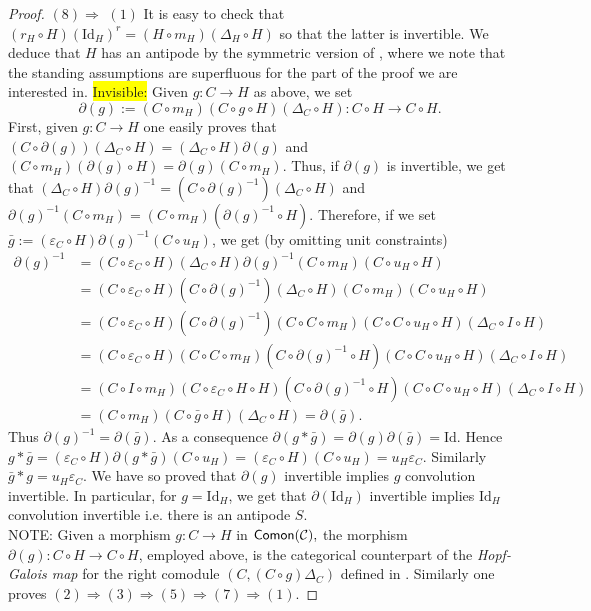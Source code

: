 \documentclass[nosumlimits,twoside]{amsart}
\theoremstyle{definition}
\theoremstyle{remark}
\newenvironment{invisible}{{\noindent\sc \colorbox{yellow}{Invisible:}\;}\color{gray}}{\medskip}
\newcommand{\id}{\mathrm{Id}}
\newcommand{\Cc}{\mathcal{C}}
\def\Comon{{\sf Comon}}
\begin{document}
\begin{proof}
    $(8)\Rightarrow$ $(1)$ It is easy to check that $(r_H\circ H)(\id_H)^r=(H\circ m_H)(\Delta_H\circ H)$ so that the latter is invertible. We deduce that $H$ has an antipode by the symmetric version of \cite[Theorem 1.8]{Ve}, where we note that the standing assumptions are superfluous for the part of the proof we are interested in.
\begin{invisible}
Given $g:C\rightarrow H$ as above, we  set
\begin{equation*}
\partial \left( g\right):=\left( C\circ m_{H}\right) \left( C\circ g\circ
H\right) \left( \Delta _{C}\circ H\right):C\circ H\to  C\circ H.
\end{equation*}
First, given $g:C\to H$ one easily proves that $(C\circ \partial(g))(\Delta_C\circ H)=(\Delta_C\circ H)\partial(g)$ and $(C\circ m_H)(\partial(g)\circ H)=\partial(g)(C\circ m_H)$. Thus, if $\partial(g)$ is invertible, we get that  $(\Delta_C\circ H)\partial(g)^{-1}=(C\circ \partial(g)^{-1})(\Delta_C\circ H)$ and $\partial(g)^{-1}(C\circ m_H)=(C\circ m_H)(\partial(g)^{-1}\circ H)$. Therefore, if we set $\bar g:=(\varepsilon_C\circ H)\partial(g)^{-1}(C\circ u_H)$, we get (by omitting unit constraints)
\begin{align*}
\partial(g)^{-1}&=(C\circ  \varepsilon_C\circ H)(\Delta_C\circ H)\partial(g)^{-1}(C\circ m_H)(C\circ  u_H\circ H)
\\ &=(C\circ  \varepsilon_C\circ H)(C\circ \partial(g)^{-1})(\Delta_C\circ H)(C\circ m_H)(C\circ  u_H\circ H)
\\ &=(C\circ  \varepsilon_C\circ H)(C\circ \partial(g)^{-1})(C\circ C\circ m_H)(C\circ C\circ   u_H\circ H)(\Delta_C\circ I\circ H)
\\ &=(C\circ  \varepsilon_C\circ H)(C\circ C\circ m_H)(C\circ \partial(g)^{-1}\circ H)(C\circ C\circ   u_H\circ H)(\Delta_C\circ I\circ H)
\\ &=(C\circ I\circ m_H)(C\circ  \varepsilon_C\circ H\circ H)(C\circ \partial(g)^{-1}\circ H)(C\circ C\circ   u_H\circ H)(\Delta_C\circ I\circ H)
\\ &=(C\circ m_H)(C\circ  \bar g\circ H)(\Delta_C\circ H)=\partial(\bar g).
\end{align*}
Thus $\partial(g)^{-1}=\partial(\bar g)$. As a consequence $\partial(g*\bar g)=\partial(g)\partial(\bar g)=\id$. Hence
$g*\bar g=(\varepsilon_C\circ H)\partial(g*\bar g)(C\circ  u_H)=(\varepsilon_C\circ H)(C\circ  u_H)=u_H\varepsilon_C$. Similarly $\bar g*g=u_H\varepsilon_C$. We have so proved that $\partial(g)$ invertible implies $g$ convolution invertible.
In particular, for $g=\id_H$, we get that $\partial(\id_H)$ invertible implies $\id_H$ convolution invertible i.e. there is an antipode $S$. \\
NOTE: Given a morphism $g:C\rightarrow H$ in $\Comon(\Cc),$ the morphism $\partial \left( g\right):C\circ H\to  C\circ H$, employed above,
    is the categorical counterpart of the \emph{Hopf-Galois map} for the right comodule $(C,(C\circ g)\Delta_C)$ defined in \cite[Definition 3.0.1]{Chemla}.
\end{invisible}
Similarly one proves  $(2)\Rightarrow(3)\Rightarrow(5)\Rightarrow(7)\Rightarrow(1)$.
\end{proof}
\end{document}
